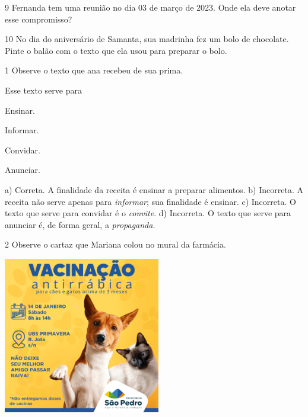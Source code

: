 \num{9} Fernanda tem uma reunião no dia 03 de março de 2023. Onde ela
deve anotar esse compromisso?


\num{10} No dia do aniversário de Samanta, sua madrinha fez um bolo de
chocolate. Pinte o balão com o texto que ela usou para preparar o bolo.



\num{1} Observe o texto que ana recebeu de sua prima.


Esse texto serve para

\begin{minipage}{.5\textwidth}
\begin{escolha}
	\item Ensinar.

	\item Informar.

	\item Convidar.

	\item Anunciar.
\end{escolha}
\end{minipage}

a) Correta. A finalidade da receita é ensinar a preparar alimentos.
b) Incorreta. A receita não serve apenas para \textit{informar}; sua
finalidade é ensinar.  
c) Incorreta. O texto que serve para convidar é o \textit{convite}.
d) Incorreta. O texto que serve para anunciar é, de forma geral, a 
\textit{propaganda}.

\num{2} Observe o cartaz que Mariana colou no mural da farmácia.

\includegraphics[width=2.70149in,height=2.70149in]{media/image115.png}


